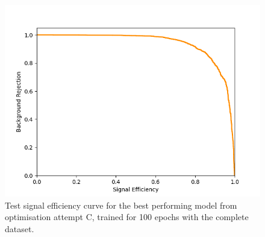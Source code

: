 \begin{figure}[] 
        \centering \includegraphics[width=\columnwidth]{figures/6vimrcb1485481664_sigeff.png}

        \caption{Test signal efficiency curve for the best performing model from optimisation attempt C, trained for 100 epochs with the complete dataset.
                \label{fig:6vimrcb1485481664_sigeff} 
        }
\end{figure}



